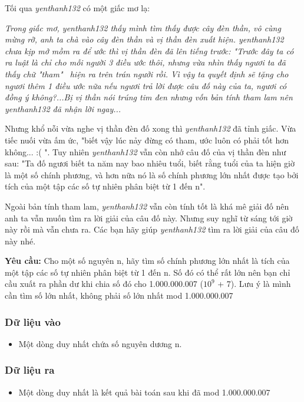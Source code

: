 



   Tối qua   \emph{    yenthanh132   }   có một giấc mơ lạ:  

\emph{    Trong giấc mơ, yenthanh132 thấy mình tìm thấy được cây đèn thần, vô cùng mừng rỡ, anh ta chà vào cây đèn thần và vị thần đèn xuất hiện. yenthanh132 chưa kịp mở mồm ra để ước thì vị thần đèn đã lên tiếng trước: "Trước đây ta có ra luật là chỉ cho mỗi người 3 điều ước thôi, nhưng vừa nhìn thấy ngươi ta đã thấy chữ "tham"  hiện ra trên trán ngưởi rồi. Vì vậy ta quyết định sẽ tặng cho ngươi thêm 1 điều ước nữa nếu ngươi trả lời được câu đố này của ta, ngươi có đồng ý không?...Bị vị thần nói trúng tim đen nhưng vốn bản tính tham lam nên yenthanh132 đã nhận lời ngay...   }

   Nhưng khổ nỗi vừa nghe vị thần đèn đố xong thì   \emph{    yenthanh132   }   đã tỉnh giấc. Vừa tiếc nuối vừa ấm ức, "biết vậy lúc nảy đừng có tham, ước luôn có phải tốt hơn không... :( ". Tuy nhiên   \emph{    yenthanh132   }   vẫn còn nhớ câu đố của vị thần đèn như sau: "Ta đố ngươi biết ta năm nay bao nhiêu tuổi, biết rằng tuổi của ta hiện giờ là một số chính phương, và hơn nữa nó là số chính phương lớn nhất được tạo bởi tích của một tập các số tự nhiên phân biệt từ 1 đến n".  

   Ngoài bản tính tham lam,   \emph{    yenthanh132   }   vẫn còn tính tốt là khá mê giải đố nên anh ta vẫn muốn tìm ra lời giải của câu đố này. Nhưng suy nghĩ từ sáng tới giờ này rồi mà vẫn chưa ra. Các bạn hãy giúp   \emph{    yenthanh132   }   tìm ra lời giải của câu đố này nhé.  

\textbf{    Yêu cầu:   }   Cho một số nguyên n, hãy tìm số chính phương lớn nhất là tích của một tập các số tự nhiên phân biệt từ 1 đến n. Số đó có thể rất lớn nên bạn chỉ cầu xuất ra phần dư khi chia số đó cho 1.000.000.007 ($10^{9}$   + 7). Lưu ý là mình cần tìm số lớn nhất, không phải số lớn nhất mod 1.000.000.007  

\subsubsection{   Dữ liệu vào  }
\begin{itemize}
	\item     Một dòng duy nhất chứa số nguyên dương n.   
\end{itemize}

\subsubsection{   Dữ liệu ra  }
\begin{itemize}
	\item     Một dòng duy nhất là kết quả bài toán sau khi đã mod 1.000.000.007   
\end{itemize}

